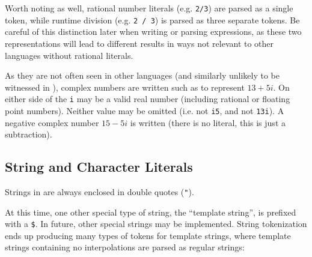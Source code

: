 Worth noting as well, rational number literals (e.g. \texttt{2/3}) are
parsed as a single token, while runtime division (e.g. \texttt{2 / 3})
is parsed as three separate tokens. Be careful of this distinction later
when writing or parsing expressions, as these two representations will
lead to different results in ways not relevant to other languages without
rational literals.

As they are not often seen in other languages (and similarly unlikely to
be witnessed in \Trilogy{}), complex numbers are written such as 
to represent $13 + 5i$. On either side of the \texttt{i} may be a valid
real number (including rational or floating point numbers). Neither value
may be omitted (i.e.  not \texttt{i5}, and  not
\texttt{13i}). A negative complex number $15 - 5i$ is written 
(there is no literal, this is just a subtraction).

\subsection{String and Character Literals}

Strings in \Trilogy{} are always enclosed in double quotes (\texttt{"}).

At this time, one other special type of string, the ``template string'',
is prefixed with a \texttt{\$}. In future, other special strings may be %
implemented. String tokenization ends up producing many types of tokens
for template strings, where template strings containing no interpolations
are parsed as regular strings:

\begin{bnf*}
    \\
     \\
     \\
     \\
     \\
\end{bnf*}

